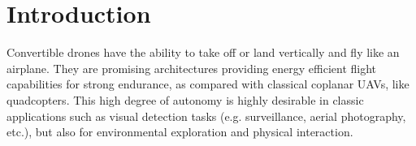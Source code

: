 \chapter*{Introduction}

Convertible drones have the ability to take off or land vertically and fly like an airplane. They are promising architectures providing energy efficient flight capabilities for strong endurance, as compared with classical coplanar UAVs, like quadcopters. This high degree of autonomy is highly desirable in classic applications such as visual detection tasks (e.g. surveillance, aerial photography, etc.), but also for environmental exploration and physical interaction.


